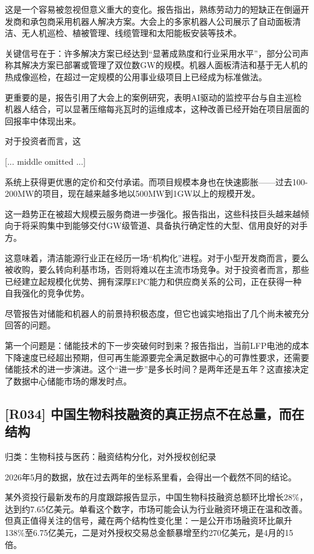 \documentclass[11pt]{ctexart}
\begin{document}
这是一个容易被忽视但意义重大的变化。报告指出，熟练劳动力的短缺正在倒逼开发商和承包商采用机器人解决方案。大会上的多家机器人公司展示了自动面板清洁、无人机巡检、植被管理、线缆管理和太阳能板安装等技术。

关键信号在于：许多解决方案已经达到“显著成熟度和行业采用水平”，部分公司声称其解决方案已部署或管理了双位数GW的规模。机器人面板清洁和基于无人机的热成像巡检，在超过一定规模的公用事业级项目上已经成为标准做法。

更重要的是，报告引用了大会上的案例研究，表明AI驱动的监控平台与自主巡检机器人结合，可以显著压缩每兆瓦时的运维成本，这种改善已经开始在项目层面的回报率中体现出来。

对于投资者而言，这

[... middle omitted ...]

系统上获得更优惠的定价和交付承诺。而项目规模本身也在快速膨胀——过去100-200MW的项目，现在越来越多地以500MW到1GW以上的规模开发。

这一趋势正在被超大规模云服务商进一步强化。报告指出，这些科技巨头越来越倾向于将采购集中到能够交付GW级管道、具备执行确定性的大型、信用良好的对手方。

这意味着，清洁能源行业正在经历一场“机构化”进程。对于小型开发商而言，要么被收购，要么转向利基市场，否则将难以在主流市场竞争。对于投资者而言，那些已经建立起规模化优势、拥有深厚EPC能力和供应商关系的公司，正在获得一种自我强化的竞争优势。

尽管报告对储能和机器人的前景持积极态度，但它也诚实地指出了几个尚未被充分回答的问题。

第一个问题是：储能技术的下一步突破何时到来？报告指出，当前LFP电池的成本下降速度已经超出预期，但可再生能源要完全满足数据中心的可靠性要求，还需要储能技术的进一步演进。这个“进一步”是多长时间？是两年还是五年？这直接决定了数据中心储能市场的爆发时点。

\subsection{[R034] 中国生物科技融资的真正拐点不在总量，而在结构}
{\small\color{refgray}归类：生物科技与医药：融资结构分化，对外授权创纪录}

2026年5月的数据，放在过去两年的坐标系里看，会得出一个截然不同的结论。

某外资投行最新发布的月度跟踪报告显示，中国生物科技融资总额环比增长28\%，达到约7.65亿美元。单看这个数字，市场可能会认为行业融资环境正在温和改善。但真正值得关注的信号，藏在两个结构性变化里：一是公开市场融资环比飙升138\%至6.75亿美元，二是对外授权交易总金额暴增至约270亿美元，是4月的15倍。
\end{document}
